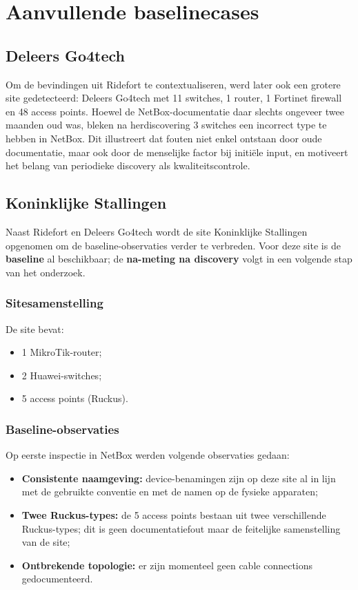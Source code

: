 \section{Aanvullende baselinecases}

\subsection{Deleers Go4tech}

Om de bevindingen uit Ridefort te contextualiseren, werd later ook een grotere site gedetecteerd: Deleers Go4tech met 11 switches, 1 router, 1 Fortinet firewall en 48 access points. Hoewel de NetBox-documentatie daar slechts ongeveer twee maanden oud was, bleken na herdiscovering 3 switches een incorrect type te hebben in NetBox. Dit illustreert dat fouten niet enkel ontstaan door oude documentatie, maar ook door de menselijke factor bij initiële input, en motiveert het belang van periodieke discovery als kwaliteitscontrole.

\subsection{Koninklijke Stallingen}

Naast Ridefort en Deleers Go4tech wordt de site Koninklijke Stallingen opgenomen om de baseline-observaties verder te verbreden. Voor deze site is de \textbf{baseline} al beschikbaar; de \textbf{na-meting na discovery} volgt in een volgende stap van het onderzoek.

\subsubsection{Sitesamenstelling}

De site bevat:
\begin{itemize}
  \item 1 MikroTik-router;
  \item 2 Huawei-switches;
  \item 5 access points (Ruckus).
\end{itemize}

\subsubsection{Baseline-observaties}

Op eerste inspectie in NetBox werden volgende observaties gedaan:
\begin{itemize}
  \item \textbf{Consistente naamgeving:} device-benamingen zijn op deze site al in lijn met de gebruikte conventie en met de namen op de fysieke apparaten;
  \item \textbf{Twee Ruckus-types:} de 5 access points bestaan uit twee verschillende Ruckus-types; dit is geen documentatiefout maar de feitelijke samenstelling van de site;
  \item \textbf{Ontbrekende topologie:} er zijn momenteel geen cable connections gedocumenteerd.
\end{itemize}

